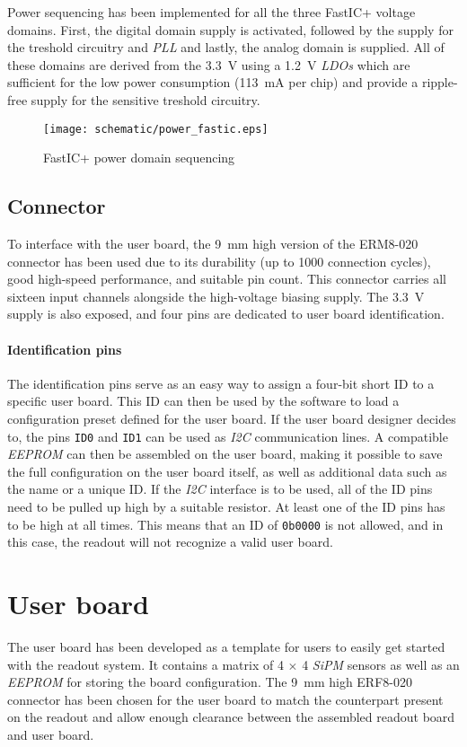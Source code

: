 Power sequencing has been implemented for all the three FastIC+ voltage domains. First, the digital domain supply is activated, followed by the supply for the treshold circuitry and \emph{PLL} and lastly, the analog domain is supplied. All of these domains are derived from the \SI{3.3}{\volt} using a \SI{1.2}{\volt} \emph{LDOs} which are sufficient for the low power consumption (\SI{113}{\milli\ampere} per chip) and provide a ripple-free supply for the sensitive treshold circuitry.

\FloatBarrier
\begin{figure}[htp!]
    \centering
    \texttt{[image: schematic/power\_fastic.eps]}
    \caption{FastIC+ power domain sequencing}
    \label{fig:schem_fastic_power}
\end{figure}
\FloatBarrier

\section{Connector}
To interface with the user board, the \SI{9}{\milli\meter} high version of the ERM8-020 connector has been used due to its durability (up to 1000 connection cycles), good high-speed performance, and suitable pin count. This connector carries all sixteen input channels alongside the high-voltage biasing supply. The \SI{3.3}{\volt} supply is also exposed, and four pins are dedicated to user board identification.
%
\subsubsection{Identification pins}
The identification pins serve as an easy way to assign a four-bit short ID to a specific user board. This ID can then be used by the software to load a configuration preset defined for the user board. If the user board designer decides to, the pins \verb|ID0| and \verb|ID1| can be used as \emph{I2C} communication lines. A compatible \emph{EEPROM} can then be assembled on the user board, making it possible to save the full configuration on the user board itself, as well as additional data such as the name or a unique ID. If the \emph{I2C} interface is to be used, all of the ID pins need to be pulled up high by a suitable resistor. At least one of the ID pins has to be high at all times. This means that an ID of \verb|0b0000| is not allowed, and in this case, the readout will not recognize a valid user board. 
%
\chapter{User board}
The user board has been developed as a template for users to easily get started with the readout system. It contains a matrix of 4 $\times$ 4 \emph{SiPM} sensors as well as an \emph{EEPROM} for storing the board configuration. The \SI{9}{\milli\meter} high ERF8-020 connector has been chosen for the user board to match the counterpart present on the readout and allow enough clearance between the assembled readout board and user board.

